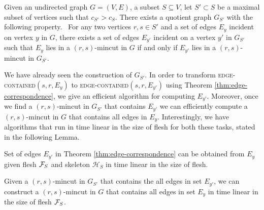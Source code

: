 \begin{theorem} \label{thm:edge-correspondence}
Given an undirected graph $G=(V,E)$, a subset $S\subseteq V$, let $S'\subset S$ be a maximal subset of vertices such that $c_{S'}>c_S$.
There exists a quotient graph $G_{S'}$ with the following property.~
For any two vertices $r,s \in S'$ and a set of edges $E_y$ incident on vertex $y$ in $G$, there exists a set of edges $E_{y'}$ incident on a vertex $y'$ in $G_{S'}$ such that $E_y$ lies in a $(r,s)$-mincut in $G$ if and only if $E_{y'}$ lies in a $(r,s)$-mincut in $G_{S'}$. 
\end{theorem}

We have already seen the construction of $G_{S'}$. In order to transform  \textsc{edge-contained}$(s,r,E_y)$ to \textsc{edge-contained}$(s,r,E_{y'})$  using Theorem \ref{thm:edge-correspondence}, we give an efficient algorithm for computing $E_{y'}$. Moreover, once we find a $(r,s)$-mincut in $G_{S'}$ that contains $E_{y'}$ we can efficiently compute a $(r,s)$-mincut in $G$ that contains all edges in $E_{y}$. Interestingly, we have algorithms that run in time linear in the size of flesh for both these tasks, stated in the following Lemma. 

\begin{lemma}
\label{lem:linear-time-qt}
Set of edges $E_{y'}$ in Theorem \ref{thm:edge-correspondence} can be obtained from $E_y$ given flesh ${\cal F}_S$ and skeleton $\mathcal H_S$ in time linear in the size of flesh.
\end{lemma}

\begin{lemma}
\label{lem:mincut-qt}
Given a $(r,s)$-mincut in $G_{S'}$ that contains the all edges in set $E_{y'}$, we can construct a $(r,s)$-mincut in $G$ that contains all edges in set $E_y$ in time linear in the size of flesh ${\cal F}_S$.
\end{lemma}

